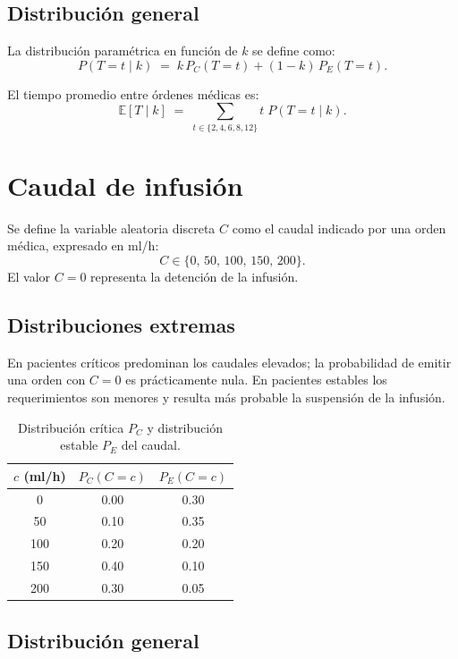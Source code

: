 \documentclass{article}
\begin{document}
\subsection*{Distribución general}

La distribución paramétrica en función de $k$ se define como:
\[
  P(T=t \mid k) \;=\; k\,P_C(T=t) + (1-k)\,P_E(T=t).
\]

El tiempo promedio entre órdenes médicas es:
\[
  \mathbb{E}[T \mid k]
  \;=\; \sum_{t \in \{2,4,6,8,12\}} t\;P(T=t \mid k).
\]

\section{Caudal de infusión}

Se define la variable aleatoria discreta $C$ como el caudal indicado por
una orden médica, expresado en ml/h:
\[
  C \in \{0,\,50,\,100,\,150,\,200\}.
\]
El valor $C=0$ representa la detención de la infusión.

\subsection*{Distribuciones extremas}

En pacientes críticos predominan los caudales elevados; la probabilidad de
emitir una orden con $C=0$ es prácticamente nula.
En pacientes estables los requerimientos son menores y resulta más probable
la suspensión de la infusión.

\begin{table}[h]
\centering
\begin{tabular}{@{}ccc@{}}
\toprule
$c$ (ml/h) & $P_C(C=c)$ & $P_E(C=c)$ \\
\midrule
0   & 0.00 & 0.30 \\
50  & 0.10 & 0.35 \\
100 & 0.20 & 0.20 \\
150 & 0.40 & 0.10 \\
200 & 0.30 & 0.05 \\
\bottomrule
\end{tabular}
\caption{Distribución crítica $P_C$ y distribución estable $P_E$ del caudal.}
\end{table}

\subsection*{Distribución general}
\end{document}
